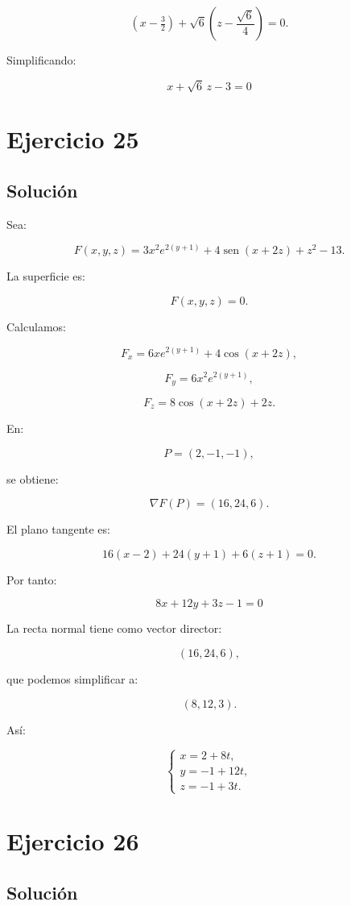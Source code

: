 \documentclass[11pt,a4paper]{article}
\newcommand{\sen}{\operatorname{sen}}
\begin{document}
\[
(x-\tfrac32)
+
\sqrt6
\left(
z-\frac{\sqrt6}{4}
\right)
=
0.
\]

Simplificando:

\[
\boxed{
x+\sqrt6\,z-3=0
}
\]

\section{Ejercicio 25}
\subsection{Solución}

Sea:

\[
F(x,y,z)
=
3x^2e^{2(y+1)}
+
4\sen(x+2z)
+
z^2
-
13.
\]

La superficie es:

\[
F(x,y,z)=0.
\]

Calculamos:

\[
F_x
=
6xe^{2(y+1)}
+
4\cos(x+2z),
\]

\[
F_y
=
6x^2e^{2(y+1)},
\]

\[
F_z
=
8\cos(x+2z)+2z.
\]

En:

\[
P=(2,-1,-1),
\]

se obtiene:

\[
\nabla F(P)
=
(16,24,6).
\]

El plano tangente es:

\[
16(x-2)
+
24(y+1)
+
6(z+1)
=
0.
\]

Por tanto:

\[
\boxed{
8x+12y+3z-1=0
}
\]

La recta normal tiene como vector director:

\[
(16,24,6),
\]

que podemos simplificar a:

\[
(8,12,3).
\]

Así:

\[
\boxed{
\begin{cases}
x=2+8t,\\
y=-1+12t,\\
z=-1+3t.
\end{cases}
}
\]

\section{Ejercicio 26}
\subsection{Solución}
\end{document}
